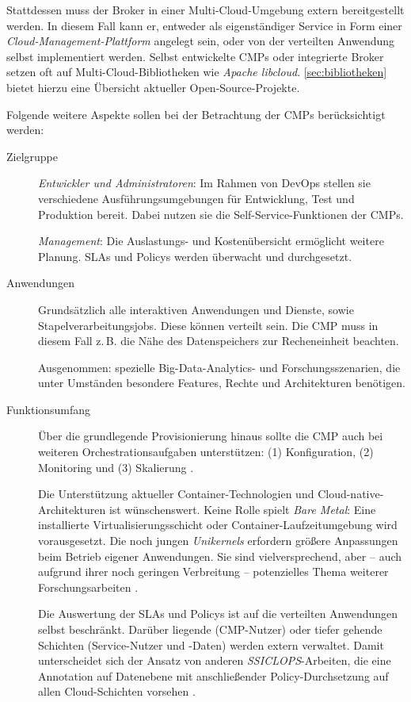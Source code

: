 Stattdessen muss der Broker in einer Multi-Cloud-Umgebung extern bereitgestellt werden. In diesem Fall kann er, entweder als eigenständiger Service in Form einer \emph{Cloud-Management-Plattform} angelegt sein, oder von der verteilten Anwendung selbst implementiert werden. Selbst entwickelte CMPs oder integrierte Broker setzen oft auf Multi-Cloud-Bibliotheken wie \emph{Apache libcloud}. \autoref{sec:bibliotheken} bietet hierzu eine Übersicht aktueller Open-Source-Projekte. 

Folgende weitere Aspekte sollen bei der Betrachtung der CMPs berücksichtigt werden:

\begin{description}
	
	\item[Zielgruppe] 	\emph{Entwickler und Administratoren}: Im Rahmen von DevOps stellen sie verschiedene Ausführungsumgebungen für Entwicklung, Test und Produktion bereit. Dabei nutzen sie die Self-Service-Funktionen der CMPs.
	
						\emph{Management}: Die Auslastungs- und Kostenübersicht ermöglicht weitere Planung. SLAs und Policys werden überwacht und durchgesetzt.
	
	\item[Anwendungen] Grundsätzlich alle interaktiven Anwendungen und Dienste, sowie Stapelverarbeitungsjobs. Diese können verteilt sein. Die CMP muss in diesem Fall z.\,B. die Nähe des Datenspeichers zur Recheneinheit beachten.
	
	Ausgenommen: spezielle Big-Data-Analytics- und Forschungsszenarien, die unter Umständen besondere Features, Rechte und Architekturen benötigen.
	
	\item[Funktionsumfang] Über die grundlegende Provisionierung hinaus sollte die CMP auch bei weiteren Orchestrationsaufgaben unterstützen: (1) Konfiguration, (2) Monitoring und (3) Skalierung \cite{weerasiri:2017:orchestration}.
	
	Die Unterstützung aktueller Container-Technologien und Cloud-native-Architekturen ist wünschenswert. Keine Rolle spielt \emph{Bare Metal}: Eine installierte Virtualisierungsschicht oder Container-Laufzeitumgebung wird vorausgesetzt. Die noch jungen \emph{Unikernels} erfordern größere Anpassungen beim Betrieb eigener Anwendungen. Sie sind vielversprechend, aber -- auch aufgrund ihrer noch geringen Verbreitung -- potenzielles Thema weiterer Forschungsarbeiten \cite{plauth:2017:unikernels}.
	
	Die Auswertung der SLAs und Policys ist auf die verteilten Anwendungen selbst beschränkt. Darüber liegende (CMP-Nutzer) oder tiefer gehende Schichten (Service-Nutzer und -Daten) werden extern verwaltet. Damit unterscheidet sich der Ansatz von anderen \emph{SSICLOPS}-Arbeiten, die eine Annotation auf Datenebene mit anschließender Policy-Durchsetzung auf allen Cloud-Schichten vorsehen \cite{ssiclops:d21:secure-data-storage, ssiclops:d22:intercloud-policies}.
		
\end{description}

